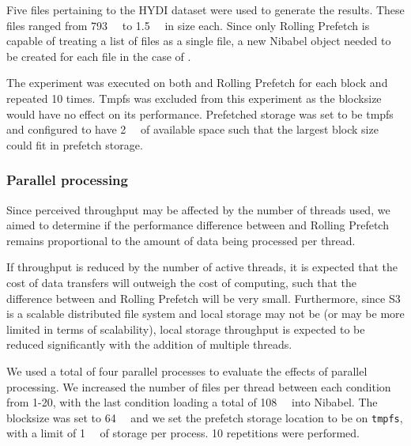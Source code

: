 \documentclass[conference]{IEEEtran}
\begin{document}
Five files pertaining to the HYDI dataset were used to generate the results.
These files ranged from \SI{793}{\mebi\byte} to
\SI{1.5}{\gibi\byte} in size each. Since only Rolling Prefetch is capable of treating a list of files as a single file, a new
Nibabel object needed to be created for each file in the case of \sfs.

The experiment was executed on both \sfs and Rolling Prefetch for each block and repeated 10 times. Tmpfs was excluded from this
experiment as the \sfs blocksize would have no effect on its performance. Prefetched storage was set to be tmpfs and
configured to have \SI{2}{\gibi\byte} of available space such that the largest block size could fit in prefetch
storage.

\subsubsection{Parallel processing}\label{exp:parallel}

Since perceived
throughput may be affected by the number of threads used, we aimed to determine if the performance difference
between \sfs and Rolling Prefetch remains proportional to the amount of data being processed per thread. 

If throughput is reduced by the number of active threads, it is expected that 
the cost of data transfers will outweigh the cost of computing, such that the difference between \sfs and Rolling Prefetch will
be very small. Furthermore, since S3 is a scalable distributed file system and local storage may not be (or may be more limited in terms of scalability), local storage
throughput is expected to be reduced significantly with the addition of multiple threads. 

We used a total of four parallel processes to evaluate the effects of parallel processing. We increased the number of
files per thread between each condition from 1-20, with the last condition loading
a total of \SI{108}{\gibi\byte} into Nibabel. The blocksize was set to \SI{64}{\mebi\byte} and we set the prefetch
storage location to be on \texttt{tmpfs}, with a limit of \SI{1}{\gibi\byte} of storage per process. 10 repetitions were
performed.
\end{document}
